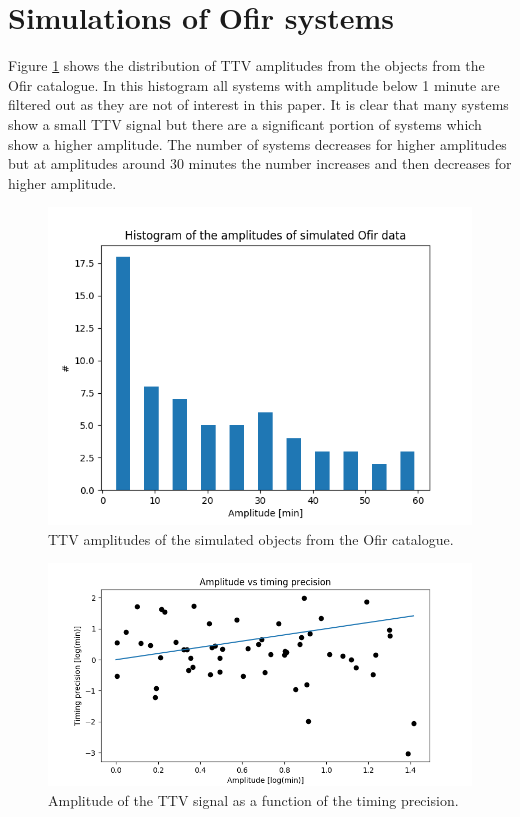 \documentclass[12pt]{report}
\begin{document}
\section{Simulations of Ofir systems}
	Figure \ref{fig:ampl_ofir} shows the distribution of TTV amplitudes from the objects from the Ofir catalogue. In this histogram all systems with amplitude below 1 minute are filtered out as they are not of interest in this paper. It is clear that many systems show a small TTV signal but there are a significant portion of systems which show a higher amplitude. The number of systems decreases for higher amplitudes but at amplitudes around 30 minutes the number increases and then decreases for higher amplitude.
\begin{figure}
 	 \centering
	  \includegraphics[width=\textwidth]{img/ampl_ofir2.png}
	  \caption{TTV amplitudes of the simulated objects from the Ofir catalogue.}
	 \label{fig:ampl_ofir}
\end{figure}

\iffalse
\begin{figure}
 	 \centering
	  \includegraphics[width=\textwidth]{img/ampErrorLog.png}
	  \caption{Amplitude of the TTV signal as a function of the timing precision.}
	 \label{fig:amp_precision}
\end{figure}
\end{document}
